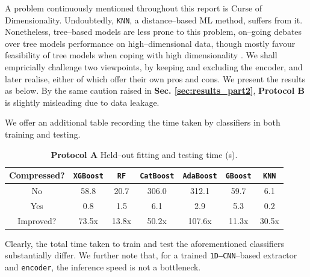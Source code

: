 \label{sec:part2_ablation}

A problem continuously mentioned throughout this report is Curse of Dimensionality. Undoubtedly, \texttt{KNN}, a distance–based ML method, suffers from it.
Nonetheless, tree–based models are less prone to this problem, on–going debates over tree models performance on high–dimensional data, though mostly favour feasibility of tree models when coping with high dimensionality \cite{JMLR:v18:16-466, 10.1007/978-3-031-80507-3_19, pmlr-v70-si17a, pmlr-v125-syrgkanis20a}.
We shall empricially challenge two viewpoints, by keeping and excluding the encoder, and later realise, either of which offer their own pros and cons. We present the results as below.
By the same caution raised in \textbf{Sec. \ref{sec:results_part2}}, \textbf{Protocol B} is slightly misleading due to data leakage.

We offer an additional table recording the time taken by classifiers in both training and testing.
\begin{table}[H]
    \centering
    \caption{\textbf{Protocol A} Held–out fitting and testing time (s).}
    \label{tab:time_compare}
    \begin{tabular}{ccccccc}
        \toprule
        Compressed? & \texttt{XGBoost} & \texttt{RF} & \texttt{CatBoost} & \texttt{AdaBoost} & \texttt{GBoost} & \texttt{KNN} \\
        \midrule
        No & 58.8 & 20.7 & 306.0 & 312.1 & 59.7 & 6.1 \\
        Yes & 0.8 & 1.5 & 6.1 & 2.9 & 5.3 & 0.2 \\
        \midrule
        \midrule
        Improved? & 73.5x & 13.8x & 50.2x & 107.6x & 11.3x & 30.5x \\
        \bottomrule
    \end{tabular}
\end{table}

Clearly, the total time taken to train and test the aforementioned classifiers substantially differ.
We further note that, for a trained \texttt{1D–CNN}–based extractor and \texttt{encoder}, the inference speed is not a bottleneck.

